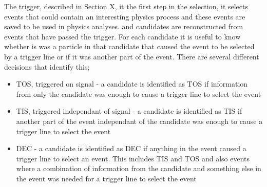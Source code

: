 

The trigger, described in Section X, it the first step in the selection, it selects events that could contain an interesting physics process and these events are saved to be used in physics analyses. \bsmumu and \bhh candidates are reconstructed from events that have passed the trigger. For each candidate it is useful to know whether is was a particle in that candidate that caused the event to be selected by a trigger line or if it was another part of the event. There are several different decisions that identify this;
\begin{itemize}
\item TOS, triggered on signal - a candidate is identified as TOS if information from only the candidate was enough to cause a trigger line to select the event
\item TIS, triggered independant of signal - a candidate is identified as TIS if another part of the event independant of the candidate was enough to cause a trigger line to select the event
\item DEC - a candidate is identified as DEC if anything in the event caused a trigger line to select an event. This includes TIS and TOS and also events where a combination of information from the candidate and something else in the event was needed for a trigger line to select the event
\end{itemize}

